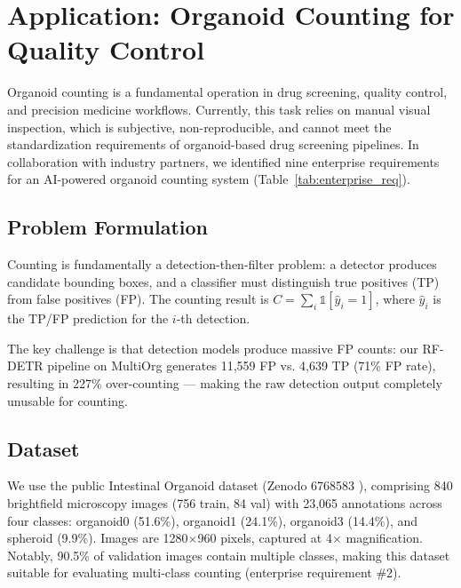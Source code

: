 
\section{Application: Organoid Counting for Quality Control}
\label{sec:counting}

Organoid counting is a fundamental operation in drug screening,
quality control, and precision medicine workflows. Currently, this
task relies on manual visual inspection, which is subjective,
non-reproducible, and cannot meet the standardization requirements
of organoid-based drug screening pipelines. In collaboration with
industry partners, we identified nine enterprise requirements for
an AI-powered organoid counting system (Table~\ref{tab:enterprise_req}).

\subsection{Problem Formulation}

Counting is fundamentally a detection-then-filter problem: a
detector produces candidate bounding boxes, and a classifier must
distinguish true positives (TP) from false positives (FP). The
counting result is $C = \sum_{i} \mathbb{1}[\hat{y}_i = 1]$,
where $\hat{y}_i$ is the TP/FP prediction for the $i$-th detection.

The key challenge is that detection models produce massive FP
counts: our RF-DETR pipeline on MultiOrg generates 11,559 FP vs.
4,639 TP (71\% FP rate), resulting in 227\% over-counting —
making the raw detection output completely unusable for counting.

\subsection{Dataset}

We use the public Intestinal Organoid dataset (Zenodo 6768583
\cite{intestinal_dataset}), comprising 840 brightfield microscopy
images (756 train, 84 val) with 23,065 annotations across four
classes: organoid0 (51.6\%), organoid1 (24.1\%), organoid3
(14.4\%), and spheroid (9.9\%). Images are 1280$\times$960 pixels,
captured at 4$\times$ magnification. Notably, 90.5\% of validation
images contain multiple classes, making this dataset suitable for
evaluating multi-class counting (enterprise requirement \#2).


